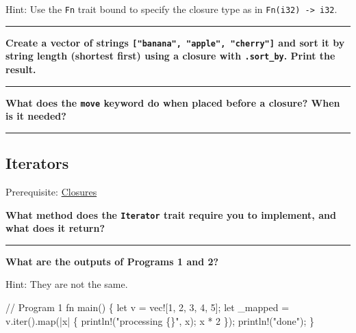 \documentclass[
  11pt,
]{article}
\newenvironment{Shaded}{}{}
\newcommand{\NormalTok}[1]{#1}
\begin{document}
Hint: Use the \texttt{Fn} trait bound to specify the closure type as in
\texttt{Fn(i32)\ -\textgreater{}\ i32}.

\begin{Shaded}
\begin{Highlighting}[]

\end{Highlighting}
\end{Shaded}

\begin{center}\rule{0.5\linewidth}{0.5pt}\end{center}

\textbf{Create a vector of strings
\texttt{{[}"banana",\ "apple",\ "cherry"{]}} and sort it by string
length (shortest first) using a closure with \texttt{.sort\_by}. Print
the result.}

\begin{Shaded}
\begin{Highlighting}[]

\end{Highlighting}
\end{Shaded}

\begin{center}\rule{0.5\linewidth}{0.5pt}\end{center}

\textbf{What does the \texttt{move} keyword do when placed before a
closure? When is it needed?}

\begin{center}\rule{0.5\linewidth}{0.5pt}\end{center}

\subsection{Iterators}\label{iterators}

Prerequisite: \hyperref[closures]{Closures}

\textbf{What method does the \texttt{Iterator} trait require you to
implement, and what does it return?}

\begin{center}\rule{0.5\linewidth}{0.5pt}\end{center}

\textbf{What are the outputs of Programs 1 and 2?}

Hint: They are not the same.

\begin{Shaded}
\begin{Highlighting}[]
\NormalTok{// Program 1}
\NormalTok{fn main() \{}
\NormalTok{    let v = vec![1, 2, 3, 4, 5];}
\NormalTok{    let \_mapped = v.iter().map(|x| \{}
\NormalTok{        println!("processing \{\}", x);}
\NormalTok{        x * 2}
\NormalTok{    \});}
\NormalTok{    println!("done");}
\NormalTok{\}}
\end{Highlighting}
\end{Shaded}
\end{document}
